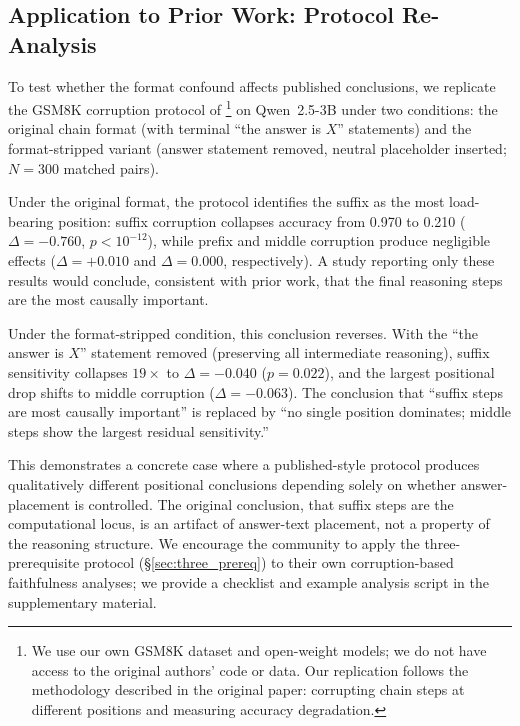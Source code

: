 \documentclass{article}
\theoremstyle{definition}
\theoremstyle{definition}
\begin{document}
\subsection{Application to Prior Work: Protocol Re-Analysis}
\label{sec:prior_reanalysis}

To test whether the format confound affects published conclusions, we
replicate the GSM8K corruption protocol of
\citet{lanham2023}\footnote{We use our own GSM8K dataset and open-weight
models; we do not have access to the original authors' code or data.
Our replication follows the methodology described in the original paper:
corrupting chain steps at different positions and measuring accuracy
degradation.} on Qwen~2.5-3B under two conditions: the original chain
format (with terminal ``the answer is $X$'' statements) and the
format-stripped variant (answer statement removed, neutral placeholder
inserted; $N{=}300$ matched pairs).

Under the original format, the protocol identifies the suffix as the most
load-bearing position: suffix corruption collapses accuracy from 0.970 to
0.210 ($\Delta{=}{-}0.760$, $p{<}10^{-12}$), while prefix and middle
corruption produce negligible effects ($\Delta{=}{+}0.010$ and
$\Delta{=}0.000$, respectively). A study reporting only these results
would conclude, consistent with prior work, that the final reasoning
steps are the most causally important.

Under the format-stripped condition, this conclusion reverses. With the
``the answer is $X$'' statement removed (preserving all intermediate
reasoning), suffix sensitivity collapses $19\times$ to
$\Delta{=}{-}0.040$ ($p{=}0.022$), and the largest positional drop shifts
to middle corruption ($\Delta{=}{-}0.063$). The conclusion that ``suffix
steps are most causally important'' is replaced by ``no single position
dominates; middle steps show the largest residual sensitivity.''

This demonstrates a concrete case where a published-style protocol produces
qualitatively different positional conclusions depending solely on whether
answer-placement is controlled. The original conclusion, that suffix steps
are the computational locus, is an artifact of answer-text placement, not
a property of the reasoning structure. We encourage the community to apply
the three-prerequisite protocol (\S\ref{sec:three_prereq}) to their own
corruption-based faithfulness analyses; we provide a checklist and example
analysis script in the supplementary material.
\end{document}
